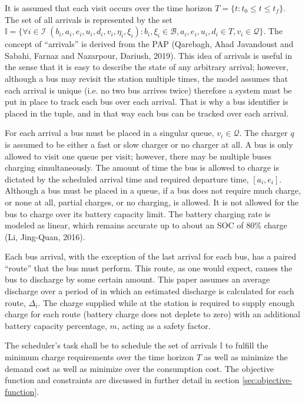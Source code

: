 \documentclass[11pt,a4paper,final]{article}
\newcommand{\visit}{(b_i, a_i, e_i, u_i, d_i, v_i, \eta_i, \xi_i)}
\newcommand{\I}{\mathbb{I}}                 %
\newcommand{\Iset}{\mathcal{I}}             %
\newcommand{\Bset}{\mathcal{B}}             %
\newcommand{\Qset}{\mathcal{Q}}             %
\begin{document}
It is assumed that each visit occurs over the time horizon \(T = \{t : t_0 \le t \le t_f \}\). The set of all arrivals is
represented by the set \(\I = \{\forall i \in \Iset \; \visit: b_i, \xi_i \in \Bset, a_i, e_i, u_i, d_i \in T, v_i \in \Qset \}\). The
concept of ``arrivals'' is derived from the PAP (Qarebagh, Ahad Javandoust and Sabahi, Farnaz and Nazarpour, Dariush, 2019). This idea of arrivals is useful in the
sense that it is easy to describe the state of any arbitrary arrival; however, although a bus may revisit the station
multiple times, the model assumes that each arrival is unique (i.e. no two bus arrives twice) therefore a system must be
put in place to track each bus over each arrival. That is why a bus identifier is placed in the tuple, and in that way
each bus can be tracked over each arrival.

For each arrival a bus must be placed in a singular queue, \(v_i \in \Qset\). The charger \(q\) is assumed to be either a fast
or slow charger or no charger at all. A bus is only allowed to visit one queue per visit; however, there may be multiple
buses charging simultaneously. The amount of time the bus is allowed to charge is dictated by the scheduled arrival time
and required departure time, \([a_i, e_i]\). Although a bus must be placed in a queue, if a bus does not require much
charge, or none at all, partial charges, or no charging, is allowed. It is not allowed for the bus to charge over its
battery capacity limit. The battery charging rate is modeled as linear, which remains accurate up to about an SOC of 80\%
charge (Li, Jing-Quan, 2016).

Each bus arrival, with the exception of the last arrival for each bus, has a paired ``route'' that the bus must perform.
This route, as one would expect, causes the bus to discharge by some certain amount. This paper assumes an average
discharge over a period of in which an estimated discharge is calculated for each route, \(\Delta_i\). The charge supplied
while at the station is required to supply enough charge for each route (battery charge does not deplete to zero) with
an additional battery capacity percentage, \(m\), acting as a safety factor.

The scheduler's task shall be to schedule the set of arrivals \(\I\) to fulfill the minimum charge requirements over the
time horizon \(T\) as well as minimize the demand cost as well as minimize over the consumption cost. The objective
function and constraints are discussed in further detail in section \ref{sec:objective-function}.
\end{document}
